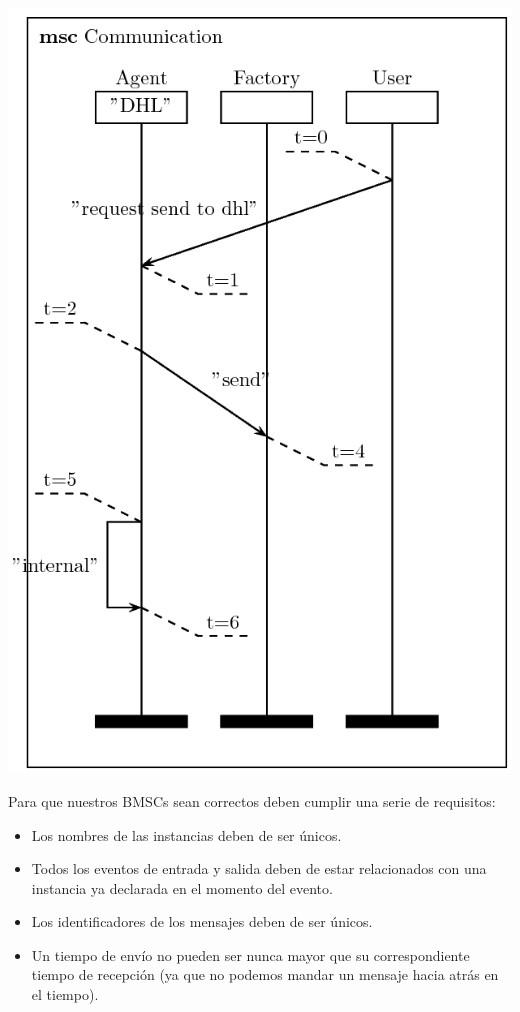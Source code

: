 \documentclass[12pt,a4paper]{report}
\begin{document}
\includegraphics[scale=0.5]{./images/fig1}


Para que nuestros BMSCs sean correctos deben cumplir una serie de requisitos:
\begin{itemize}
\item Los nombres de las instancias deben de ser únicos.
\item Todos los eventos de entrada y salida deben de estar relacionados con una instancia ya declarada en el momento del evento.
\item Los identificadores de los mensajes deben de ser únicos.
\item Un tiempo de envío no pueden ser nunca mayor que su correspondiente tiempo de recepción (ya que no podemos mandar un mensaje hacia atrás en el tiempo).
\end{itemize}
\end{document}
